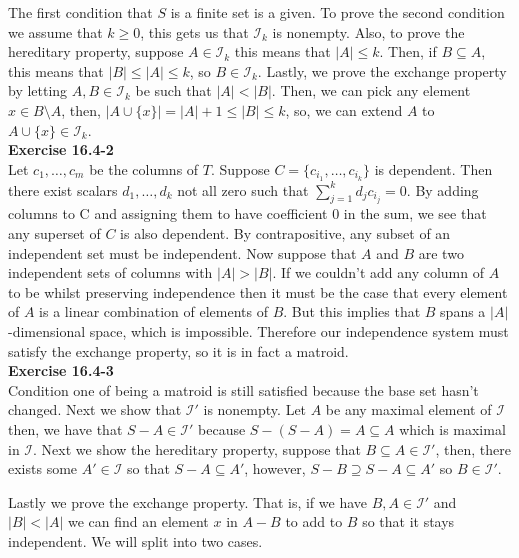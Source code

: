 \documentclass{article}
\begin{document}
The first condition that $S$ is a finite set is a given. To prove the second condition we assume that $k\ge 0$, this gets us that $\mathcal{I}_k$ is nonempty. Also, to prove the hereditary property, suppose $A\in \mathcal{I}_k$ this means that $|A| \le k$. Then, if $B\subseteq A$, this means that $|B| \le |A| \le k$, so $B\in \mathcal{I}_k$. Lastly, we prove the exchange property by letting $A,B\in\mathcal{I}_k$ be such that $|A|<|B|$. Then, we can pick any element $x \in B\setminus A$, then, $|A\cup\{x\}|  = |A|+1 \le |B| \le k$, so, we can extend $A$ to $A\cup \{x\}\in \mathcal{I}_k$.\\

\noindent\textbf{Exercise 16.4-2}\\

Let $c_1, \ldots, c_m$ be the columns of $T$.  Suppose $C = \{c_{i_1}, \ldots, c_{i_k}\}$ is dependent.  Then there exist scalars $d_1, \ldots , d_k$ not all zero such that $\sum_{j=1}^k d_j c_{i_j} = 0$.  By adding columns to C and assigning them to have coefficient 0 in the sum, we see that any superset of $C$ is also dependent.  By contrapositive, any subset of an independent set must be independent.  Now suppose that $A$ and $B$ are two independent sets of columns with $|A| > |B|$.  If we couldn't add any column of $A$ to be whilst preserving independence then it must be the case that every element of $A$ is a linear combination of elements of $B$.  But this implies that $B$ spans a $|A|$-dimensional space, which is impossible.  Therefore our independence system must satisfy the exchange property, so it is in fact a matroid. \\

\noindent\textbf{Exercise 16.4-3}\\

Condition one of being a matroid is still satisfied because the base set hasn't changed. Next we show that $\mathcal{I}'$ is nonempty. Let $A$ be any maximal element of $\mathcal{I}$ then, we have that $S - A \in \mathcal{I}'$ because $S - (S-A) = A\subseteq A$ which is maximal in $\mathcal{I}$. Next we show the hereditary property, suppose that $B \subseteq A \in \mathcal{I}'$, then, there exists some $A'\in\mathcal{I}$ so that $S - A \subseteq A'$, however, $S-B \supseteq S-A \subseteq A'$ so $B\in \mathcal{I}'$.

Lastly we prove the exchange property. That is, if we have $B,A \in \mathcal{I}'$ and $|B|<|A|$ we can find an element $x$ in $A-B$ to add to $B$ so that it stays independent. We will split into two cases. 
\end{document}

